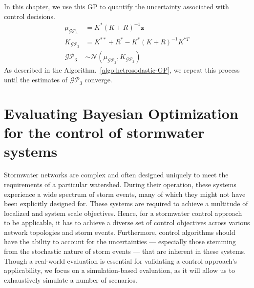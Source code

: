 In this chapter, we use this GP to quantify the uncertainty associated with control decisions.
\begin{subequations}\label{eq:gp3-cov}
\begin{align}
	\mu_{\mathcal{GP}_3} &= K^{*}{(K+R)}^{-1} \mathbf{z}\\
	K_{\mathcal{GP}_3} &= K^{* *}+R^{*}-K^{*}{(K+R)}^{-1} K^{* T}\\
	\mathcal{GP}_3 &\sim \mathcal{N} (\mu_{\mathcal{GP}_3}, K_{\mathcal{GP}_3})
\end{align}
\end{subequations}
As described in the Algorithm.~\ref{algo:hetrosodastic-GP}, we repeat this process until the estimates of $\mathcal{GP}_3$ converge.

\section{Evaluating Bayesian Optimization for the control of stormwater systems}\label{sec:methods}
Stormwater networks are complex and often designed uniquely to meet the requirements of a particular watershed.
During their operation, these systems experience a wide spectrum of storm events, many of which they might not have been explicitly designed for.
These systems are required to achieve a multitude of localized and system scale objectives.
Hence, for a stormwater control approach to be applicable, it has to achieve a diverse set of control objectives across various network topologies and storm events.
Furthermore, control algorithms should have the ability to account for the uncertainties --- especially those stemming from the stochastic nature of storm events --- that are inherent in these systems. 
Though a real-world evaluation is essential for validating a control approach's applicability, we focus on a simulation-based evaluation, as it will allow us to exhaustively simulate a number of scenarios. 


\

